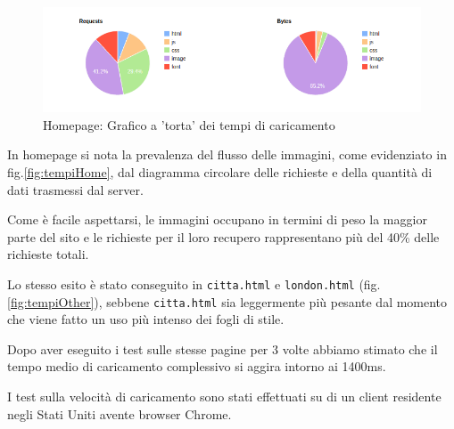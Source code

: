 \begin{figure}[h]
\includegraphics[width=\linewidth]{images/performance/webpagetest/home-graph.png}
\caption{Homepage: Grafico a 'torta' dei tempi di caricamento}
\end{figure}

In homepage si nota la prevalenza del flusso delle immagini, come evidenziato
in fig.\ref{fig:tempiHome}, dal diagramma circolare delle richieste e della
quantità di dati trasmessi dal server.

Come è facile aspettarsi, le immagini occupano in termini di peso la maggior
parte del sito e le richieste per il loro recupero rappresentano più del 40\%
delle richieste totali.


Lo stesso esito è stato conseguito in \texttt{citta.html} e
\texttt{london.html} (fig.\ref{fig:tempiOther}), sebbene \texttt{citta.html}
sia leggermente più pesante dal momento che viene fatto un uso più intenso dei
fogli di stile.

Dopo aver eseguito i test sulle stesse pagine per 3 volte abbiamo stimato che il tempo medio di caricamento complessivo si aggira intorno ai 1400ms.

I test sulla velocità di caricamento sono stati effettuati su di un client residente negli Stati Uniti avente browser Chrome.


